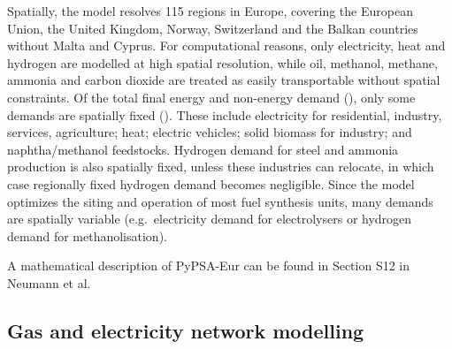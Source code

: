 Spatially, the model resolves 115 regions in
Europe,\cite{frysztackiStrongEffect2021} covering the European Union, the United
Kingdom, Norway, Switzerland and the Balkan countries without Malta and Cyprus.
For computational reasons, only electricity, heat and hydrogen are modelled at
high spatial resolution, while oil, methanol, methane, ammonia and carbon
dioxide are treated as easily transportable without spatial constraints. Of the
total final energy and non-energy demand (), only
some demands are spatially fixed (). These include
electricity for residential, industry, services, agriculture; heat; electric
vehicles; solid biomass for industry; and naphtha/methanol feedstocks. Hydrogen
demand for steel and ammonia production is also spatially fixed, unless these
industries can relocate, in which case regionally fixed hydrogen demand becomes
negligible. Since the model optimizes the siting and operation of most fuel
synthesis units, many demands are spatially variable (e.g.~electricity demand
for electrolysers or hydrogen demand for methanolisation).

A mathematical description of PyPSA-Eur can be found in
Section S12 in Neumann et al.\cite{neumannPotentialRoleHydrogen2023}

\subsection*{Gas and electricity network modelling}

